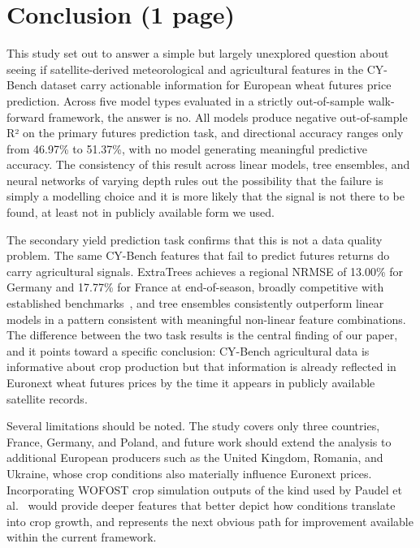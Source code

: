 \documentclass[pdflatex,sn-mathphys-num, oneside]{sn-jnl}%
\theoremstyle{thmstyleone}%
\theoremstyle{thmstyletwo}%
\theoremstyle{thmstylethree}%
\begin{document}
\section{Conclusion (1 page)}\label{sec3}
This study set out to answer a simple but largely unexplored question about seeing if satellite-derived meteorological and agricultural features in the CY-Bench dataset carry actionable information for European wheat futures price prediction. Across five model types evaluated in a strictly out-of-sample walk-forward framework, the answer is no. All models produce negative out-of-sample R² on the primary futures prediction task, and directional accuracy ranges only from 46.97\% to 51.37\%, with no model generating meaningful predictive accuracy. The consistency of this result across linear models, tree ensembles, and neural networks of varying depth rules out the possibility that the failure is simply a modelling choice and it is more likely that the signal is not there to be found, at least not in publicly available form we used.

The secondary yield prediction task confirms that this is not a data quality problem. The same CY-Bench features that fail to predict futures returns do carry agricultural signals. ExtraTrees achieves a regional NRMSE of 13.00\% for Germany and 17.77\% for France at end-of-season, broadly competitive with established benchmarks~\cite{bib16}, and tree ensembles consistently outperform linear models in a pattern consistent with meaningful non-linear feature combinations. The difference between the two task results is the central finding of our paper, and it points toward a specific conclusion: CY-Bench agricultural data is informative about crop production but that information is already reflected in Euronext wheat futures prices by the time it appears in publicly available satellite records.

Several limitations should be noted. The study covers only three countries, France, Germany, and Poland, and future work should extend the analysis to additional European producers such as the United Kingdom, Romania, and Ukraine, whose crop conditions also materially influence Euronext prices. Incorporating WOFOST crop simulation outputs of the kind used by Paudel et al.~\cite{bib16} would provide deeper features that better depict how conditions translate into crop growth, and represents the next obvious path for improvement available within the current framework.
\end{document}
